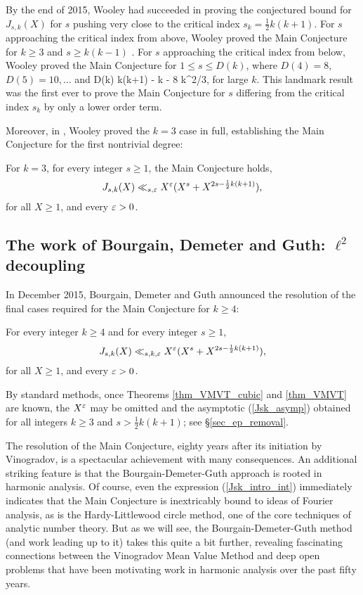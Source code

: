 \documentclass[brochure,english,12pt]{bourbaki}%
\begin{document}
 By the end of 2015, Wooley had succeeded in proving the conjectured bound for $J_{s,k}(X)$ for $s$ pushing very close to the critical index $s_k = \frac{1}{2}k(k+1)$. For $s$ approaching the critical index from above, Wooley proved the Main Conjecture for $k \geq 3$ and $s \geq k(k-1)$ \cite{Woo14b}. For $s$ approaching the critical index from below,  Wooley  \cite{Woo17b} proved the Main Conjecture for $1 \leq s \leq D(k)$, where $D(4)=8,$ $D(5)=10,...$ and 
\beq\label{Wooley_final}
D(k) \leq {}k(k+1) -  k - 8 k^{2/3},
 \eeq
 for large $k$.
This landmark result was the first ever to prove the Main Conjecture for $s$ differing from the critical index $s_k$ by only a lower order term. 
 

Moreover, in \cite{Woo16c}, Wooley proved the $k=3$ case in full, establishing the Main Conjecture for the first nontrivial degree:

\begin{theo}[Wooley:  Vinogradov Mean Value Theorem, $k=3$]\label{thm_VMVT_cubic}
For $k=3$, for every integer $s \geq 1$, the Main Conjecture holds,
\[ J_{s,k} (X) \ll_{s,\varepsilon} X^\varepsilon(X^s + X^{2s - \frac{1}{2}k(k+1)}),\]
for all $X \geq 1$, and every $\varepsilon>0$.
\end{theo}


\subsection{The work of Bourgain, Demeter and Guth: $\ell^2$ decoupling}

In December 2015, Bourgain, Demeter and Guth \cite{BDG16} announced the resolution of the final cases required for the Main Conjecture for $k \geq 4$:
\begin{theo}\label{thm_VMVT}
For every integer $k \geq 4$ and for every integer $s \geq 1$,
\[ J_{s,k}(X) \ll_{s,k,\varepsilon} X^\varepsilon ( X^s + X^{2s - \frac{1}{2} k(k+1)}),\]
for all $X \geq 1$, and every $\varepsilon>0$.
\end{theo}
By standard methods, once Theorems \ref{thm_VMVT_cubic} and \ref{thm_VMVT} are known, the $X^\varepsilon$  may be omitted and the asymptotic (\ref{Jsk_asymp}) obtained  for all integers $k \geq 3$ and $s > \frac{1}{2}k(k+1)$; see \S \ref{sec_ep_removal}.


The resolution of the Main Conjecture, eighty years after its initiation by Vinogradov, is  a spectacular achievement with many consequences. An additional striking feature is that the Bourgain-Demeter-Guth approach is rooted in harmonic analysis. Of course, even the expression (\ref{Jsk_intro_int}) immediately indicates that the Main Conjecture is inextricably bound to ideas of Fourier analysis, as is the Hardy-Littlewood circle method, one of the core techniques of analytic number theory.
But as we will see, the Bourgain-Demeter-Guth method (and work leading up to it) takes this quite a bit further, revealing fascinating connections between the Vinogradov Mean Value Method and deep open problems that have been motivating work  in harmonic analysis over the past fifty years. 
\end{document}
